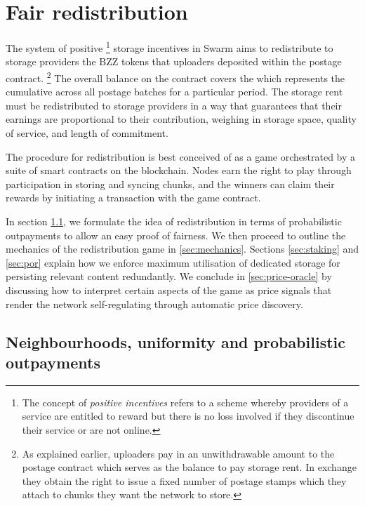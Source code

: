 \section{Fair redistribution}\label{sec:redistribution}


The system of positive%
%
\footnote{The concept of \emph{positive incentives} refers to a scheme whereby providers of a service are entitled to reward but there is no loss involved if they discontinue their service or are not online.}
%
storage incentives in Swarm aims to redistribute to storage providers the BZZ tokens that uploaders deposited within the postage contract.%
%
\footnote{As explained earlier, uploaders pay in an unwithdrawable amount to the postage contract which serves as the balance to pay storage rent. In exchange they obtain the right to issue a fixed number of postage stamps which they attach to chunks they want the network to store.}
%
The overall balance on the contract covers the  which represents the cumulative  across all postage batches for a particular period. The storage rent must be redistributed to storage providers in a way that guarantees that their earnings are proportional to their contribution, weighing in storage space, quality of service, and length of commitment.

The procedure for redistribution is best conceived of as a game orchestrated by a suite of smart contracts on the blockchain. Nodes earn the right to play through participation in storing and syncing chunks, and the winners can claim their rewards by initiating a transaction with the game contract. 

In section \ref{sec:uniformity-pot}, we formulate the idea of redistribution in terms of probabilistic outpayments to allow an easy proof of fairness. We then proceed to outline the mechanics of the redistribution game in \ref{sec:mechanics}.
Sections \ref{sec:staking} and \ref{sec:por} explain how we enforce maximum utilisation of dedicated storage for persisting relevant content redundantly. We conclude in \ref{sec:price-oracle} by discussing how to interpret certain aspects of the game as price signals that render the network self-regulating through automatic price discovery. 

\subsection{Neighbourhoods, uniformity and probabilistic outpayments}\label{sec:uniformity-pot} 

